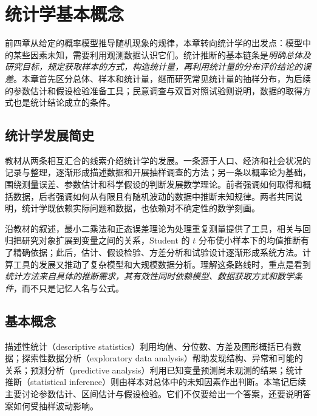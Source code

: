 \setcounter{chapter}{4} %
\chapter{统计学基本概念}
\label{chap:study-statistics-basics}

前四章从给定的概率模型推导随机现象的规律，本章转向统计学的出发点：模型中的某些因素未知，需要利用观测数据认识它们。统计推断的基本链条是\emph{明确总体及研究目标，规定获取样本的方式，构造统计量，再利用统计量的分布评价结论的误差}。本章首先区分总体、样本和统计量，继而研究常见统计量的抽样分布，为后续的参数估计和假设检验准备工具；民意调查与双盲对照试验则说明，数据的取得方式也是统计结论成立的条件。

\section{统计学发展简史}
\label{sec:study-statistics-history}

教材从两条相互汇合的线索介绍统计学的发展。一条源于人口、经济和社会状况的记录与整理，逐渐形成描述数据和开展抽样调查的方法；另一条以概率论为基础，围绕测量误差、参数估计和科学假设的判断发展数学理论。前者强调如何取得和概括数据，后者强调如何从有限且有随机波动的数据中推断未知规律。两者共同说明，统计学既依赖实际问题和数据，也依赖对不确定性的数学刻画。

沿教材的叙述，最小二乘法和正态误差理论为处理重复测量提供了工具，相关与回归把研究对象扩展到变量之间的关系，Student 的 $t$ 分布使小样本下的均值推断有了精确依据；此后，估计、假设检验、方差分析和试验设计逐渐形成系统方法。计算工具的发展又推动了复杂模型和大规模数据分析。理解这条路线时，重点是看到\emph{统计方法来自具体的推断需求，其有效性同时依赖模型、数据获取方式和数学条件}，而不只是记忆人名与公式。

\section{基本概念}
\label{sec:study-statistical-concepts}

描述性统计（descriptive statistics）利用均值、分位数、方差及图形概括已有数据；探索性数据分析（exploratory data analysis）帮助发现结构、异常和可能的关系；预测分析（predictive analysis）利用已知变量预测尚未观测的结果；统计推断（statistical inference）则由样本对总体中的未知因素作出判断。本笔记后续主要讨论参数估计、区间估计与假设检验。它们不仅要给出一个答案，还要说明答案如何受抽样波动影响。

